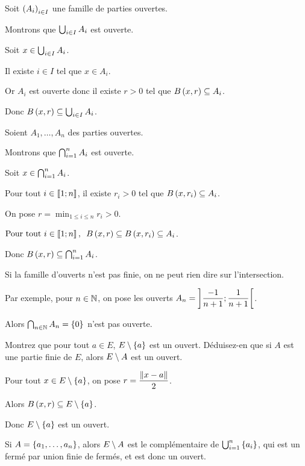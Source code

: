 \begin{dem}
Soit \(\left(A_i\right)_{i\in I}\) une famille de parties ouvertes.

Montrons que \(\bigcup_{i\in I}A_i\) est ouverte.

Soit \(x\in\bigcup_{i\in I}A_i\).

Il existe \(i\in I\) tel que \(x\in A_i\).

Or \(A_i\) est ouverte donc il existe \(r>0\) tel que \(\bouleo{x}{r}\subset A_i\).

Donc \(\bouleo{x}{r}\subset\bigunion_{i\in I}A_i\).
\end{dem}

\begin{dem}
Soient \(A_1,\dots,A_n\) des parties ouvertes.

Montrons que \(\bigcap_{i=1}^nA_i\) est ouverte.

Soit \(x\in\bigcap_{i=1}^nA_i\).

Pour tout \(i\in\left\llbracket1;n\right\rrbracket\), il existe \(r_i>0\) tel que \(\bouleo{x}{r_i}\subset A_i\).

On pose \(r=\min_{1\leq i\leq n}r_i>0\).

\(\quantifs{\Tpt i\in\interventierii{1}{n}}\bouleo{x}{r}\subset\bouleo{x}{r_i}\subset A_i\).

Donc \(\bouleo{x}{r}\subset\biginter_{i=1}^nA_i\).
\end{dem}

\begin{rem}
Si la famille d'ouverts n'est pas finie, on ne peut rien dire sur l'intersection.

Par exemple, pour \(n\in\mathbb{N}\), on pose les ouverts \(A_n=\left]\dfrac{-1}{n+1};\dfrac{1}{n+1}\right[\).

Alors \(\bigcap_{n\in\mathbb{N}}A_n=\left\lbrace0\right\rbrace\) n'est pas ouverte.
\end{rem}

\begin{exo}
Montrez que pour tout \(a\in E\), \(E\setminus\left\lbrace a\right\rbrace\) est un ouvert. Déduisez-en que si \(A\) est une partie finie de \(E\), alors \(E\setminus A\) est un ouvert.
\end{exo}

\begin{corr}
Pour tout \(x\in E\setminus\left\lbrace a\right\rbrace\), on pose \(r=\dfrac{\norme{x-a}}{2}\).

Alors \(\bouleo{x}{r}\subset E\excluant\accol{a}\).

Donc \(E\setminus\left\lbrace a\right\rbrace\) est un ouvert.

Si \(A=\left\lbrace a_1,\dots,a_n\right\rbrace\), alors \(E\setminus A\) est le complémentaire de \(\bigcup_{i=1}^n\left\lbrace a_i\right\rbrace\), qui est un fermé par union finie de fermés, et est donc un ouvert.
\end{corr}

